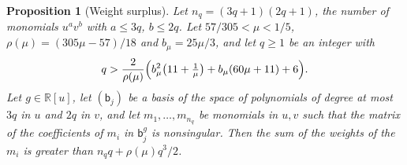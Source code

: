 \documentclass[11pt,reqno]{amsart}
\newtheorem{proposition}[theorem]{Proposition}
\theoremstyle{definition}
\theoremstyle{remark}
\numberwithin{equation}{section}
\newcommand{\R}{\mathbb R}\newcommand{\Z}{\mathbb Z}\newcommand{\N}{\mathbb N}
\begin{document}
\begin{proposition}[Weight surplus]\label{prop:surplus}
Let $n_q=(3q+1)(2q+1)$, the number of monomials $u^av^b$ with $a\le3q$,
$b\le2q$. Let $57/305<\mu<1/5$, $\rho(\mu)=(305\mu-57)/18$ and
$b_\mu=25\mu/3$, and let
$q\ge1$ be an integer with
\begin{equation}\label{eq:qlarge}
 q>\frac{2}{\rho(\mu)}\Bigl(b_\mu^2\bigl(11+\tfrac1\mu\bigr)+b_\mu(60\mu+11)+6\Bigr).
\end{equation}
Let $g\in\R[u]$, let $(\mathsf b_j)$ be a basis of the space of polynomials of degree
at most $3q$ in $u$ and $2q$ in $v$, and let $m_1,\dots,m_{n_q}$ be
monomials in $u,v$ such that the matrix of the coefficients of $m_i$ in
$\mathsf b_j^g$ is nonsingular. Then the sum of the weights of the $m_i$ is greater
than $n_qq+\rho(\mu)q^3/2$.
\end{proposition}
\end{document}
